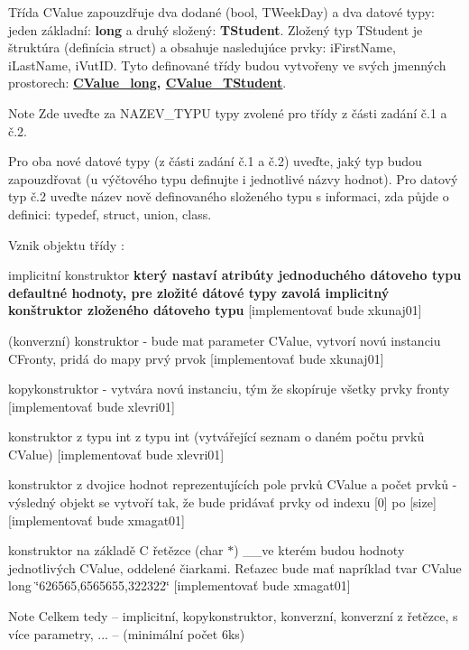 \begin{DoxyEnumerate}
\item Třída {\ttfamily C\+Value} zapouzdřuje dva dodané ({\ttfamily bool}, {\ttfamily T\+Week\+Day}) a dva datové typy\+: jeden základní\+: {\bfseries long} a druhý složený\+: {\bfseries T\+Student}. Zložený typ T\+Student je štruktúra (definícia struct) a obsahuje nasledujúce prvky\+: i\+First\+Name, i\+Last\+Name, i\+Vut\+ID. Tyto definované třídy budou vytvořeny ve svých jmenných prostorech\+: {\bfseries \hyperlink{namespace_c_value__long}{C\+Value\+\_\+long}, \hyperlink{namespace_c_value___t_student}{C\+Value\+\_\+\+T\+Student}}. \begin{DoxyNote}{Note}
Zde uveďte za N\+A\+Z\+E\+V\+\_\+\+T\+Y\+PU typy zvolené pro třídy z části zadání č.1 a č.2. 

Pro oba nové datové typy (z části zadání č.1 a č.2) uveďte, jaký typ budou zapouzdřovat (u výčtového typu definujte i jednotlivé názvy hodnot). Pro datový typ č.2 uveďte název nově definovaného složeného typu s informaci, zda půjde o definici\+: {\ttfamily typedef}, {\ttfamily struct}, {\ttfamily union}, {\ttfamily class}.
\end{DoxyNote}

\item Vznik objektu třídy {}\+:
\begin{DoxyItemize}
\item implicitní konstruktor {\bfseries který nastaví atribúty jednoduchého dátoveho typu defaultné hodnoty, pre zložité dátové typy zavolá implicitný konštruktor zloženého dátoveho typu} \mbox{[}implementovať bude xkunaj01\mbox{]}
\item (konverzní) konstruktor -\/ bude mat parameter C\+Value, vytvorí novú instanciu C\+Fronty, pridá do mapy prvý prvok \mbox{[}implementovať bude xkunaj01\mbox{]}
\item kopykonstruktor -\/ vytvára novú instanciu, tým že skopíruje všetky prvky fronty \mbox{[}implementovať bude xlevri01\mbox{]}
\item konstruktor z typu int z typu int (vytvářející seznam o daném počtu prvků C\+Value) \mbox{[}implementovať bude xlevri01\mbox{]}
\item konstruktor z dvojice hodnot reprezentujících pole prvků C\+Value a počet prvků -\/ výsledný objekt se vytvoří tak, že bude pridávať prvky od indexu \mbox{[}0\mbox{]} po \mbox{[}size\mbox{]} \mbox{[}implementovať bude xmagat01\mbox{]}
\item konstruktor na základě C řetězce (char $\ast$) \+\_\+\+\_\+ve kterém budou hodnoty jednotlivých C\+Value, oddelené čiarkami. Reťazec bude mať napríklad tvar C\+Value long \char`\"{}626565,6565655,322322\char`\"{} \mbox{[}implementovať bude xmagat01\mbox{]} \begin{DoxyNote}{Note}
Celkem tedy – implicitní, kopykonstruktor, konverzní, konverzní z řetězce, s více parametry, ... – (minimální počet 6ks)
\end{DoxyNote}


\end{DoxyItemize}
\end{DoxyEnumerate}
